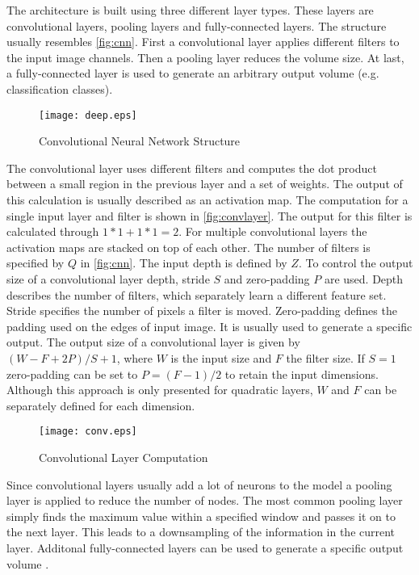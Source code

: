 The architecture is built using three different layer types. These layers are convolutional layers, pooling layers
and fully-connected layers. The structure usually resembles \autoref{fig:cnn}. First a convolutional layer applies different
filters to the input image channels. Then a pooling layer reduces the volume size. At last, a fully-connected
layer is used to generate an arbitrary output volume (e.g. classification classes).
\endgroup

\begin{figure}[ht]
\centering
\texttt{[image: deep.eps]}
\caption{Convolutional Neural Network Structure}
\label{fig:cnn}
\end{figure}


\begingroup
The convolutional layer uses different filters and computes the dot product between a small region in the previous layer and a set of weights. The output
of this calculation is usually described as an activation map. The computation for a single input layer and filter is shown in \autoref{fig:convlayer}.
The output for this filter is calculated through $1*1 + 1*1 = 2$. For multiple convolutional layers the activation maps are stacked on top of each other.
The number of filters is specified by $Q$ in \autoref{fig:cnn}. The input depth is defined by $Z$.
To control the output size of a convolutional layer depth, stride $S$ and zero-padding $P$ are used. Depth describes
the number of filters, which separately learn a different feature set. Stride specifies the number
of pixels a filter is moved. Zero-padding defines the padding used on the edges of input image. It is usually used to generate a
specific output. The output size of a convolutional layer is given by $(W - F + 2P)/S + 1$, where $W$ is the input
size and $F$ the filter size. If $S = 1$ zero-padding can be set to $P = (F - 1)/2$ to retain the input dimensions. Although this approach is only
presented for quadratic layers, $W$ and $F$ can be separately defined for each dimension.
\endgroup


\begin{figure}[ht]
\centering
\texttt{[image: conv.eps]}
\caption{Convolutional Layer Computation}
\label{fig:convlayer}
\end{figure}


\begingroup
Since convolutional layers usually add a lot of neurons to the model a pooling layer is applied to reduce the number of nodes.
The most common pooling layer simply finds the maximum value within a specified window and passes it on to the next layer.
This leads to a downsampling of the information in the current layer. Additonal fully-connected layers can be used to generate
a specific output volume \cite{ConvGit, ConvIntro, ConvVisual}.
\endgroup


